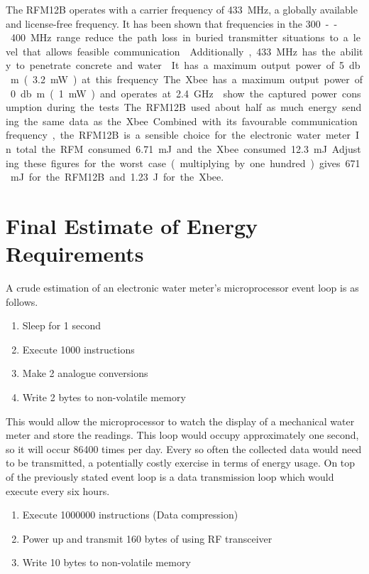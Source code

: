     The RFM12B operates with a carrier frequency of \SI{433}{\mega\hertz}, a globally available and license-free frequency.
    It has been shown that frequencies in the \SI{300}--\SI{400}{\mega\hertz} range reduce the path loss in buried transmitter situations to a level that allows feasible communication~\cite{Li2007}.
    Additionally, \SI{433}{\mega\hertz} has the ability to penetrate concrete and water~\cite{Arsalan2012}.
    It has a maximum output power of \SI{5}{\decibel m} (\SI{3.2}{\milli\watt}) at this frequency.
    The Xbee has a maximum output power of \SI{0}{\decibel m} (\SI{1}{\milli\watt}) and operates at \SI{2.4}{\giga\hertz}.
     show the captured power consumption during the tests.
    The RFM12B used about half as much energy sending the same data as the Xbee.
    Combined with its favourable communication frequency, the RFM12B is a sensible choice for the electronic water meter.
    In total the RFM consumed \SI{6.71}{\milli\joule} and the Xbee consumed \SI{12.3}{\milli\joule}.
    Adjusting these figures for the worst case (multiplying by one hundred) gives \SI{671}{\milli\joule} for the RFM12B and \SI{1.23}{\joule} for the Xbee.

  \section{Final Estimate of Energy Requirements}

    A crude estimation of an electronic water meter's microprocessor event loop is as follows.
    \begin{enumerate}
      \item Sleep for 1 second
      \item Execute 1000 instructions
      \item Make 2 analogue conversions
      \item Write 2 bytes to non-volatile memory
    \end{enumerate}
    This would allow the microprocessor to watch the display of a mechanical water meter and store the readings.
    This loop would occupy approximately one second, so it will occur 86400 times per day.
    Every so often the collected data would need to be transmitted, a potentially costly exercise in terms of energy usage.
    On top of the previously stated event loop is a data transmission loop which would execute every six hours.
    \begin{enumerate}
      \item Execute 1000000 instructions (Data compression)
      \item Power up and transmit 160 bytes of using RF transceiver
      \item Write 10 bytes to non-volatile memory
    \end{enumerate}

